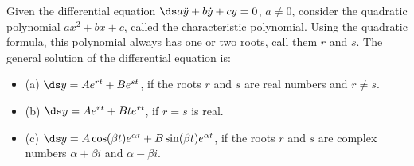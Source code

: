 \begin{theorem} Given 
\label{thm:solns to second order homogeneous}
the differential equation $\ds a\ddot y+b\dot y+cy=0$, $a\not=0$,
consider the quadratic polynomial $ax^2+bx+c$, called the
     {\dfont characteristic polynomial}. Using the quadratic formula, this polynomial
     always has one or two roots, call them $r$ and $s$.  The general
     solution of the differential equation is:

\begin{itemize} %
\item{(a)} $\ds y=Ae^{rt}+Be^{st}$, if the roots $r$ and $s$ are real
  numbers and $r\not=s$.

\item{(b)} $\ds y=Ae^{rt}+Bte^{rt}$, if $r=s$ is real.

\item{(c)} $\ds y=A\cos(\beta t)e^{\alpha t}+B\sin(\beta t)e^{\alpha t}$, 
if the roots $r$ and $s$ are complex numbers $\alpha+\beta i$ and
$\alpha-\beta i$.

\end{itemize}
\end{theorem}

